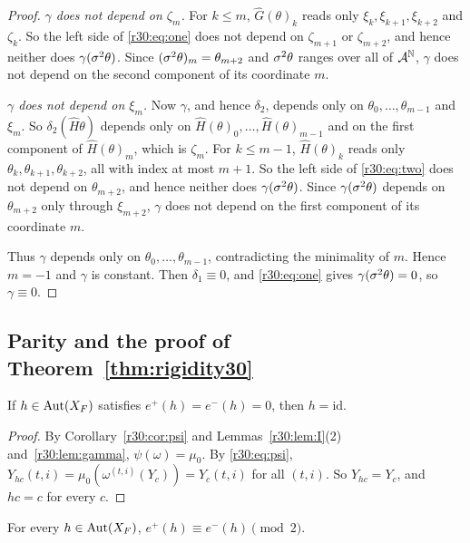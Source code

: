 \begin{proof}
\emph{$\gamma$ does not depend on $\zeta_m$.} For $k\le m$, $\hat G(\theta)_k$ reads only $\xi_k,\xi_{k+1},\xi_{k+2}$ and $\zeta_k$. So the left side of \eqref{r30:eq:one} does not depend on $\zeta_{m+1}$ or $\zeta_{m+2}$, and hence neither does $\gamma(\sigma^2\theta)$. Since $(\sigma^2\theta)_m=\theta_{m+2}$ and $\sigma^2\theta$ ranges over all of $\mathcal{A}^{\mathbb{N}}$, $\gamma$ does not depend on the second component of its coordinate $m$.

\emph{$\gamma$ does not depend on $\xi_m$.} Now $\gamma$, and hence $\delta_2$, depends only on $\theta_0,\dots,\theta_{m-1}$ and $\xi_m$. So $\delta_2(\hat H\theta)$ depends only on $\hat H(\theta)_0,\dots,\hat H(\theta)_{m-1}$ and on the first component of $\hat H(\theta)_m$, which is $\zeta_m$. For $k\le m-1$, $\hat H(\theta)_k$ reads only $\theta_k,\theta_{k+1},\theta_{k+2}$, all with index at most $m+1$. So the left side of \eqref{r30:eq:two} does not depend on $\theta_{m+2}$, and hence neither does $\gamma(\sigma^2\theta)$. Since $\gamma(\sigma^2\theta)$ depends on $\theta_{m+2}$ only through $\xi_{m+2}$, $\gamma$ does not depend on the first component of its coordinate $m$.

Thus $\gamma$ depends only on $\theta_0,\dots,\theta_{m-1}$, contradicting the minimality of $m$. Hence $m=-1$ and $\gamma$ is constant. Then $\delta_1\equiv0$, and \eqref{r30:eq:one} gives $\gamma(\sigma^2\theta)=0$, so $\gamma\equiv0$.
\end{proof}

\subsection{Parity and the proof of Theorem~\ref{thm:rigidity30}}\label{r30:sec:conclusion}

\begin{proposition}\label{r30:prop:trivial}
If $h\in\operatorname{Aut}(X_F)$ satisfies $e^+(h)=e^-(h)=0$, then $h=\mathrm{id}$.
\end{proposition}

\begin{proof}
By Corollary~\ref{r30:cor:psi} and Lemmas~\ref{r30:lem:I}(2) and~\ref{r30:lem:gamma}, $\psi(\omega)=\mu_0$. By \eqref{r30:eq:psi}, $Y_{hc}(t,i)=\mu_0(\omega^{(t,i)}(Y_c))=Y_c(t,i)$ for all $(t,i)$. So $Y_{hc}=Y_c$, and $hc=c$ for every $c$.
\end{proof}

\begin{lemma}\label{r30:lem:parity}
For every $h\in\operatorname{Aut}(X_F)$, $e^+(h)\equiv e^-(h)\pmod 2$.
\end{lemma}


